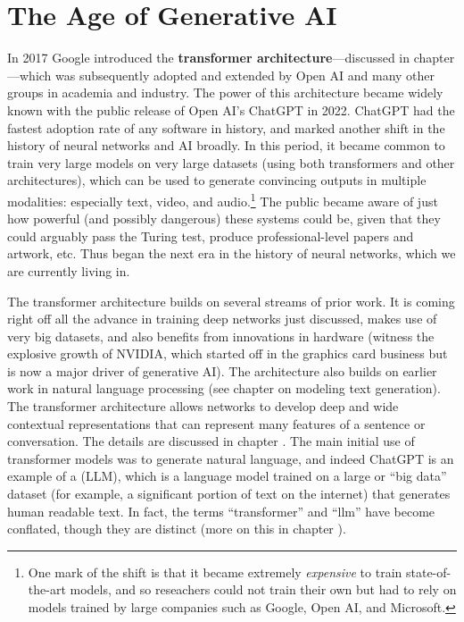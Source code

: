 \section{The Age of Generative AI}\label{age_generative_ai}

In 2017 Google introduced the \textbf{transformer architecture}---discussed in chapter ---which was subsequently adopted and extended by Open AI and many other groups in academia and industry\cite{vaswani2017attention}. The power of this architecture became widely known with the public release of Open AI's ChatGPT in 2022. ChatGPT had the fastest adoption rate of any software in history, and marked another shift in the history of neural networks and AI broadly. In this period, it became common to train very large models on very large datasets (using both transformers and other architectures), which can be used to generate convincing outputs in multiple modalities: especially text, video, and audio.\footnote{One mark of the shift is that it became extremely \emph{expensive} to train state-of-the-art models, and so reseachers could not train their own but had to rely on models trained by large companies such as Google, Open AI, and Microsoft.} The public became aware of just how powerful (and possibly dangerous) these systems could be, given that they could arguably pass the Turing test, produce professional-level papers and artwork, etc. Thus began the next era in the history of neural networks, which we are currently living in. 

The transformer architecture builds on several streams of prior work. It is coming right off all the advance in training deep networks just discussed, makes use of very big datasets, and also benefits from innovations in hardware (witness the explosive growth of NVIDIA, which started off in the graphics card business but is now a major driver of generative AI). The architecture also builds on earlier work in natural language processing (see chapter  on modeling text generation). The transformer architecture allows networks to develop deep and wide contextual representations that can represent many features of a sentence or conversation.  The details are discussed in chapter . The main initial use of transformer models was to generate natural language, and indeed ChatGPT is an example of a  (LLM), which is a language model trained on a large or ``big data'' dataset (for example, a significant portion of text on the internet) that generates human readable text. In fact, the terms ``transformer'' and ``llm'' have become conflated, though they are distinct (more on this in chapter ). 

